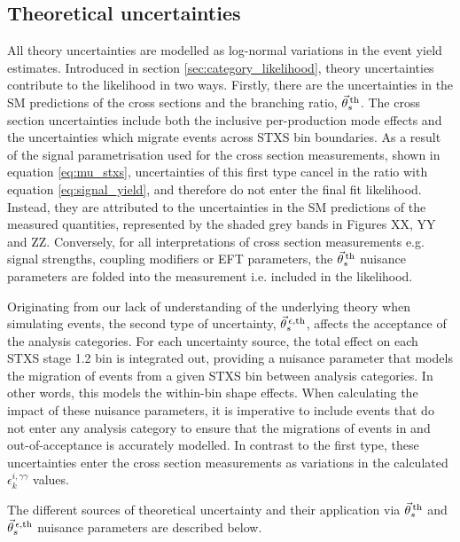 \subsection{Theoretical uncertainties}\label{sec:systematics_theoretical}
All theory uncertainties are modelled as log-normal variations in the event yield estimates. Introduced in section \ref{sec:category_likelihood}, theory uncertainties contribute to the likelihood in two ways. Firstly, there are the uncertainties in the SM predictions of the cross sections and the \hgg branching ratio, $\vec{\theta}^{\,\rm{th}}_{s}$. The cross section uncertainties include both the inclusive per-production mode effects and the uncertainties which migrate events across STXS bin boundaries. As a result of the signal parametrisation used for the cross section measurements, shown in equation \ref{eq:mu_stxs}, uncertainties of this first type cancel in the ratio with equation \ref{eq:signal_yield}, and therefore do not enter the final fit likelihood. Instead, they are attributed to the uncertainties in the SM predictions of the measured quantities, represented by the shaded grey bands in Figures XX, YY and ZZ. Conversely, for all interpretations of cross section measurements e.g. signal strengths, coupling modifiers or EFT parameters, the $\vec{\theta}^{\,\rm{th}}_{s}$ nuisance parameters are folded into the measurement i.e. included in the likelihood.

Originating from our lack of understanding of the underlying theory when simulating events, the second type of uncertainty, $\vec{\theta}^{\,\epsilon,{\rm{th}}}_{s}$, affects the acceptance of the analysis categories. For each uncertainty source, the total effect on each STXS stage 1.2 bin is integrated out, providing a nuisance parameter that models the migration of events from a given STXS bin between analysis categories. In other words, this models the within-bin shape effects. When calculating the impact of these nuisance parameters, it is imperative to include events that do not enter any analysis category to ensure that the migrations of events in and out-of-acceptance is accurately modelled. In contrast to the first type, these uncertainties enter the cross section measurements as variations in the calculated $\epsilon^{i,\gamma\gamma}_{k}$ values.

The different sources of theoretical uncertainty and their application via $\vec{\theta}^{\,\rm{th}}_{s}$ and $\vec{\theta}^{\,\epsilon,{\rm{th}}}_{s}$ nuisance parameters are described below.

